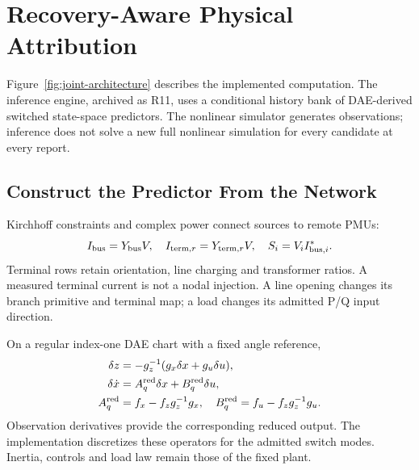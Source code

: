 \section{Recovery-Aware Physical Attribution}
\label{sec:narrative-method}

Figure~\ref{fig:joint-architecture} describes the implemented computation.
The inference engine, archived as R11, uses a conditional history bank of
DAE-derived switched state-space predictors. The nonlinear simulator
generates observations; inference does not solve a new full nonlinear
simulation for every candidate at every report.

\subsection{Construct the Predictor From the Network}

Kirchhoff constraints and complex power connect sources to remote PMUs:
\begin{equation}
 I_{\rm bus}=Y_{\rm bus}V,\quad
 I_{{\rm term},r}=Y_{{\rm term},r}V,\quad S_i=V_i I_{{\rm bus},i}^{*}.
 \label{eq:narrative-electrical}
\end{equation}
Terminal rows retain orientation, line charging and transformer ratios.
A measured terminal current is not a nodal injection. A line opening
changes its branch primitive and terminal map; a load changes its admitted
P/Q input direction.

On a regular index-one DAE chart with a fixed angle reference,
\begin{align}
 \delta z&=-g_z^{-1}(g_x\delta x+g_u\delta u),\nonumber\\
 \delta\dot x&=A_q^{\rm red}\delta x+B_q^{\rm red}\delta u,\nonumber\\
 A_q^{\rm red}&=f_x-f_zg_z^{-1}g_x,\quad
 B_q^{\rm red}=f_u-f_zg_z^{-1}g_u.
 \label{eq:narrative-reduction}
\end{align}
Observation derivatives provide the corresponding reduced output. The
implementation discretizes these operators for the admitted switch modes.
Inertia, controls and load law remain those of the fixed plant.

